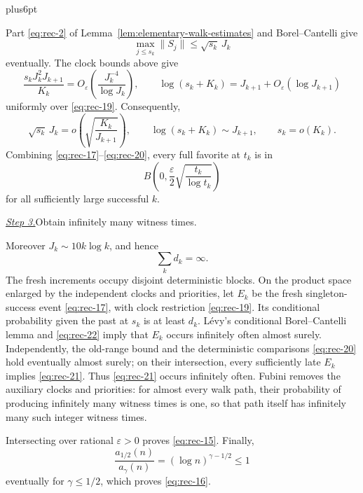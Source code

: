 \documentclass[12pt,reqno]{amsart}
\makeatletter
\theoremstyle{plain}
\theoremstyle{definition}
\theoremstyle{remark}
\renewenvironment{proof}[1][\proofname]{%
  \par
  \pushQED{\qed}%
  \normalfont
  \topsep6pt plus6pt\relax
  \trivlist
  \item[\hskip\labelsep\slshape #1\@addpunct{.}]%
  \ignorespaces
}{%
  \popQED
  \endtrivlist
  \@endpefalse
}
\DeclareRobustCommand{\qed}{%
  \leavevmode\unskip\penalty9999\hbox{}\nobreak
  \ifmmode
    \makebox[0pt][l]{\qquad\hbox{\qedsymbol}}%
  \else
    \qquad\hbox{\qedsymbol}%
  \fi
}
\renewcommand{\qedsymbol}{\rule[.47pt]{4pt}{6pt}}
\numberwithin{equation}{section}
\makeatother
\begin{document}
\begin{proof}
Part \eqref{eq:rec-2} of Lemma~\ref{lem:elementary-walk-estimates} and Borel--Cantelli give
\[
       \max_{j\le s_k}\lVert S_j\rVert
       \le \sqrt{s_k}\,J_k
\]
eventually. The clock bounds above give
\[
 \frac{s_kJ_k^2J_{k+1}}{K_k}
 =O_{\varepsilon}\left(\frac{J_k^{-4}}{\log J_k}\right),
 \qquad
 \log(s_k+K_k)=J_{k+1}+O_{\varepsilon}(\log J_{k+1})
\]
uniformly over \eqref{eq:rec-19}. Consequently,
\begin{equation}
\sqrt{s_k}\,J_k=o\left(\sqrt{\frac{K_k}{J_{k+1}}}\right),
 \qquad \log(s_k+K_k)\sim J_{k+1},\qquad s_k=o(K_k).            \label{eq:rec-20}
\end{equation}
Combining \eqref{eq:rec-17}--\eqref{eq:rec-20}, every full favorite at \(t_k\) is in
\begin{equation}
B\left(0,\frac{\varepsilon}{2}
                    \sqrt{\frac{t_k}{\log t_k}}\right)        \label{eq:rec-21}
\end{equation}
for all sufficiently large successful \(k\).

\smallskip\noindent\underline{\textit{Step 3.}}\quad Obtain infinitely many witness times.

Moreover \(J_k\sim10k\log k\), and hence
\begin{equation}
\sum_kd_k=\infty.                                      \label{eq:rec-22}
\end{equation}
The fresh increments occupy disjoint deterministic blocks.  On the product
space enlarged by the independent clocks and priorities, let \(E_k\)
be the fresh singleton-success event \eqref{eq:rec-17}, with clock restriction \eqref{eq:rec-19}.
Its conditional probability given the past at \(s_k\) is at least
\(d_k\).  Lévy's conditional Borel--Cantelli lemma and \eqref{eq:rec-22} imply that
\(E_k\) occurs infinitely often almost surely.  Independently, the
old-range bound and the deterministic comparisons \eqref{eq:rec-20} hold eventually
almost surely; on their intersection, every sufficiently late \(E_k\)
implies \eqref{eq:rec-21}.  Thus \eqref{eq:rec-21} occurs infinitely often.  Fubini removes the
auxiliary clocks and priorities: for almost every walk path, their
probability of producing infinitely many witness times is one, so that
path itself has infinitely many such integer witness times.

Intersecting over rational \(\varepsilon>0\) proves \eqref{eq:rec-15}.  Finally,
\[
       \frac{a_{1/2}(n)}{a_\gamma(n)}
       =(\log n)^{\gamma-1/2}\le1
\]
eventually for \(\gamma\le1/2\), which proves \eqref{eq:rec-16}.
\end{proof}
\end{document}
